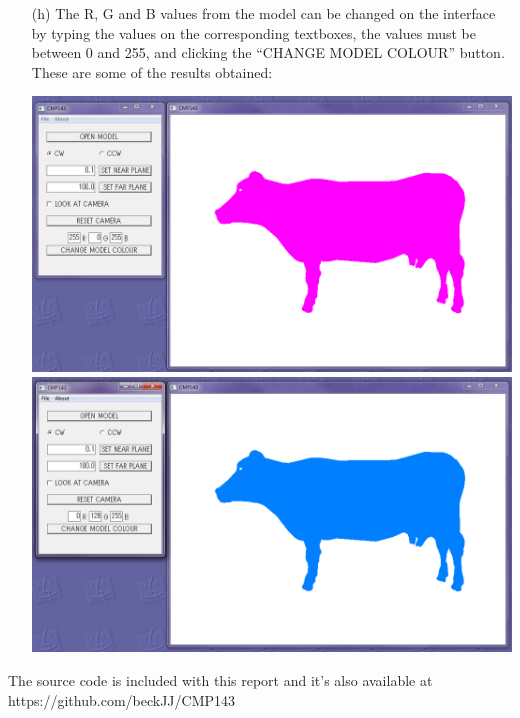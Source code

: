 \documentclass[12pt]{article}
\begin{document}
\begin{itemize}
\item[(h)] The R, G and B values from the model can be changed on the interface by typing the values on the corresponding textboxes, the values must be between 0 and 255, and clicking the ``CHANGE MODEL COLOUR'' button. These are some of the results obtained:
\begin{center}
	\includegraphics[scale=0.5]{13.png}
	\includegraphics[scale=0.5]{14.png}
\end{center}
\end{itemize}

The source code is included with this report and it's also available at https://github.com/beckJJ/CMP143
\end{document}
